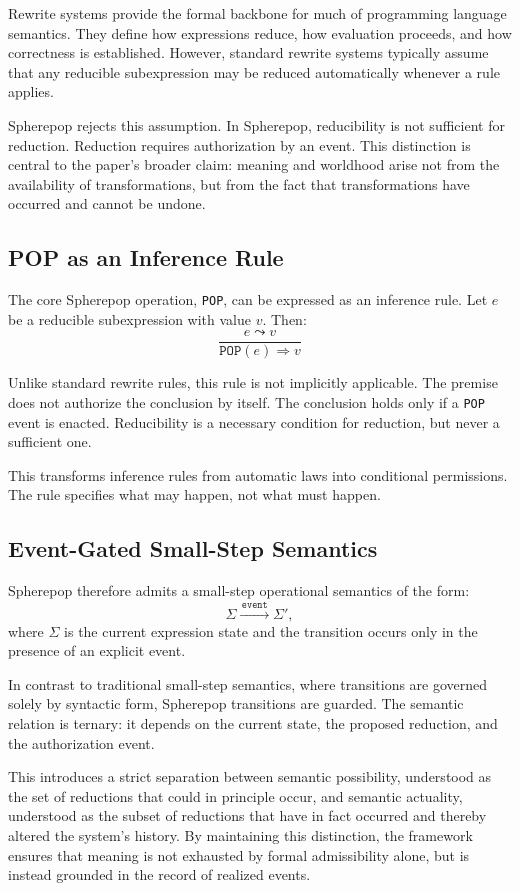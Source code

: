 \documentclass[11pt]{article}
\begin{document}
Rewrite systems provide the formal backbone for much of programming language semantics. They define how expressions reduce, how evaluation proceeds, and how correctness is established. However, standard rewrite systems typically assume that any reducible subexpression may be reduced automatically whenever a rule applies.

Spherepop rejects this assumption. In Spherepop, reducibility is not sufficient for reduction. Reduction requires authorization by an event. This distinction is central to the paper’s broader claim: meaning and worldhood arise not from the availability of transformations, but from the fact that transformations have occurred and cannot be undone.

\subsection{POP as an Inference Rule}

The core Spherepop operation, \texttt{POP}, can be expressed as an inference rule. Let $e$ be a reducible subexpression with value $v$. Then:
\[
\frac{e \leadsto v}{\texttt{POP}(e) \Rightarrow v}
\]

Unlike standard rewrite rules, this rule is not implicitly applicable. The premise does not authorize the conclusion by itself. The conclusion holds only if a \texttt{POP} event is enacted. Reducibility is a necessary condition for reduction, but never a sufficient one.

This transforms inference rules from automatic laws into conditional permissions. The rule specifies what may happen, not what must happen.

\subsection{Event-Gated Small-Step Semantics}

Spherepop therefore admits a small-step operational semantics of the form:
\[
\Sigma \xrightarrow{\,\texttt{event}\,} \Sigma',
\]
where $\Sigma$ is the current expression state and the transition occurs only in the presence of an explicit event.

In contrast to traditional small-step semantics, where transitions are governed solely by syntactic form, Spherepop transitions are guarded. The semantic relation is ternary: it depends on the current state, the proposed reduction, and the authorization event.

This introduces a strict separation between semantic possibility, understood as the set of reductions that could in principle occur, and semantic actuality, understood as the subset of reductions that have in fact occurred and thereby altered the system’s history. By maintaining this distinction, the framework ensures that meaning is not exhausted by formal admissibility alone, but is instead grounded in the record of realized events.
\end{document}
